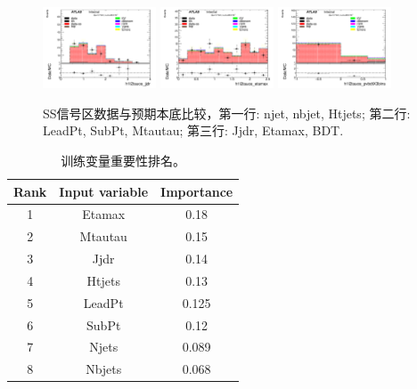 \begin{figure}[htbp]
\begin{center}
  \includegraphics[width=0.3\textwidth, keepaspectratio]{fig/OneLepTwoTaus/Plots_Plots_jjdr_ssdata_signal.pdf}
  \includegraphics[width=0.3\textwidth, keepaspectratio]{fig/OneLepTwoTaus/Plots_Plots_etamax_ssdata_signal.pdf}
  \includegraphics[width=0.3\textwidth, keepaspectratio]{fig/OneLepTwoTaus/Plots_Plots_bdtT3bins_ssdata_signal.pdf}
\end{center}
\caption{SS信号区数据与预期本底比较，第一行: njet, nbjet, Htjets; 第二行: LeadPt, SubPt, Mtautau; 第三行: Jjdr, Etamax, BDT.}
\label{Fig:1l2tau.ssbdtvalidation}
\end{figure}

\begin{table}[htbp]
\begin{center}
\begin{tabular}{c|c|c}\hline
Rank & Input variable  & Importance \\ \hline
1 & Etamax & 0.18\\
2 & Mtautau & 0.15 \\
3 & Jjdr & 0.14 \\
4 & Htjets & 0.13 \\
5 & LeadPt & 0.125 \\
6 & SubPt & 0.12 \\
7 & Njets & 0.089 \\
8 & Nbjets & 0.068 \\ \hline
\end{tabular}
\caption{训练变量重要性排名。}
\label{Tab:1l2tau.bdtrank}
\end{center}
\end{table}

